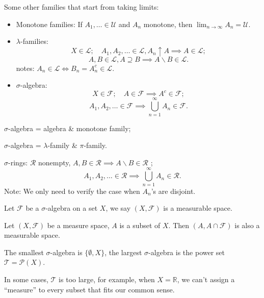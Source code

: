 \begin{definition}
	Some other families that start from taking limits:
	\begin{itemize}
		\item Monotone families: If $A_1,\dots\in \mathscr{U}$ and $A_n$
			monotone, then  $\lim_{n\to \infty}A_n =\mathscr{U}$.
		\item $\lambda$-families:
			\[
			X\in \mathscr{L};\quad
			A_1,A_2,\dots\in \mathscr{L}, A_n \uparrow A\implies A\in \mathscr{L};
			\]
			\[
			A,B\in \mathscr{L}, A \supseteq B \implies A\backslash B \in\mathscr{L}.
			\]
			notes: $A_n\in \mathscr{L}\iff B_n = A_n^c\in \mathscr{L}$.

		\item $\sigma$-algebra:
			\[
			X\in \mathscr{F};\quad A\in \mathscr{F}\implies A^c\in \mathscr{F};
			\]
			\[
			A_1,A_2,\dots\in \mathscr{F}\implies
			\bigcup_{n=1}^\infty A_n\in \mathscr{F}.
			\]
	\end{itemize}
\end{definition}
\begin{proposition}
	$\sigma$-algebra = algebra \& monotone family;

	$\sigma$-algebra =  $\lambda$-family \&  $\pi$-family.
\end{proposition}
\begin{definition}
	$\sigma$-rings:  $\mathscr{R}$ nonempty, $A,B\in \mathscr{R}\implies
	A\backslash B\in \mathscr{R}$ ;
	\[
	A_1,A_2,\dots\in \mathscr{R}\implies \bigcup_{n=1}^\infty A_n\in \mathscr{R}.
	\]
	Note: We only need to verify the case when $A_n$'s are disjoint.
\end{definition}

\begin{definition}
	Let $\mathscr{F}$ be a $\sigma$-algebra on a set $X$,
	we say $(X, \mathscr{F})$ is a measurable space.
\end{definition}

\begin{proposition}
	Let $(X,\mathscr{F})$ be a measure space, $A$ is a subset of $X$.
	Then $(A, A\cap \mathscr{F})$ is also a measurable space.
\end{proposition}

The smallest $\sigma$-algebra is  $\{\emptyset, X\}$,
the largest $\sigma$-algebra is the power set $\mathscr{T}=\mathcal{P}(X)$.

In some cases, $\mathscr{T}$ is too large, for example,
when $X=\mathbb{R}$, we can't assign a ``measure'' to every subset
that fits our common sense.
